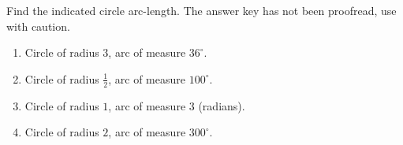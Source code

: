 Find the indicated circle arc-length. The answer key has not been proofread, use with caution. 
\begin{enumerate}
\item Circle of radius $3$, arc of measure $36^\circ$.

\item Circle of radius $\frac{1}{2}$, arc of measure $100^\circ$.

\item Circle of radius $1$, arc of measure $3$ (radians).

\item Circle of radius $2$, arc of measure $300^\circ$.

\end{enumerate}